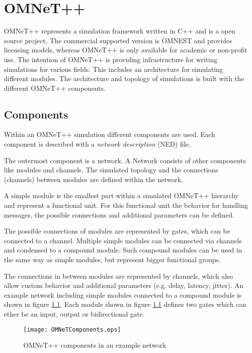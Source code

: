 \chapter{OMNeT++}

\label{sec:OMNeT}
OMNeT++ represents a simulation framework written in C++ and is a open source project.
The commercial supported version is OMNEST and provides licensing models, whereas OMNeT++ is only available for academic or non-profit use.
The intention of OMNeT++ is providing infrastructure for writing simulations for various fields.
This includes an architecture for simulating different modules.
The architecture and topology of simulations is built with the different OMNeT++ components.

\section{Components}
Within an OMNeT++ simulation different components are used.
Each component is described with a \emph{network description} (NED) file.

The outermost component is a network.
A Network consists of other components like modules and channels.
The simulated topology and the connections (channels) between modules are defined within the network.

A simple module is the smallest part within a simulated OMNeT++ hierarchy and represent a functional unit.
For this functional unit the behavior for handling messages, the possible connections and additional parameters can be defined.

The possible connections of modules are represented by gates, which can be connected to a channel.
Multiple simple modules can be connected via channels and condensed to a compound module.
Such compound modules can be used in the same way as simple modules, but represent bigger functional groups.

The connections in between modules are represented by channels, which also allow custom behavior and additional parameters (e.g. delay, latency, jitter).
An example network including simple modules connected to a compound module is shown in figure \ref{fig:OMNeTComponents}.
Each module shown in figure \ref{fig:OMNeTComponents} defines two gates which can ether be an input, output or bidirectional gate.

\begin{figure}
    \centering
    \texttt{[image: OMNeTComponents.eps]}
    \caption{OMNeT++ components in an example network}
    \label{fig:OMNeTComponents}
\end{figure}


